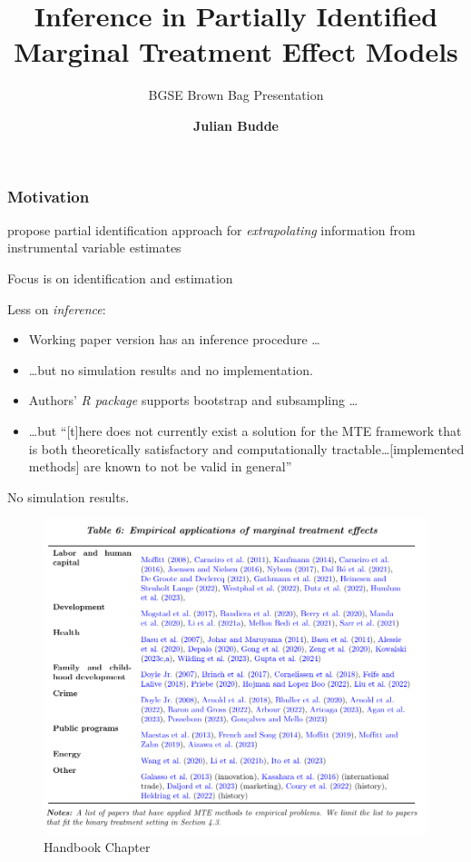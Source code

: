 \documentclass[11pt, aspectratio=169]{beamer}
\title{Inference in Partially Identified Marginal Treatment Effect Models}
\subtitle{BGSE Brown Bag Presentation}
\author[Julian Budde]{\bf Julian Budde}
\begin{document}
\begin{frame}
    \titlepage
    \note{~}
\end{frame}

\begin{frame}
    \frametitle{Motivation}

    \citet{mogstad2018using} propose partial identification approach for \textit{extrapolating} information from instrumental variable estimates

    \vspace{0.5cm}

    Focus is on identification and estimation

    \vspace{0.5cm}

    Less on \textit{inference}:

    \vspace{0.5cm}
    \pause
    \begin{itemize}
        \footnotesize
        \item Working paper version has an inference procedure \dots
        \item \dots but no simulation results and no implementation.
        \pause
        \item Authors' \textit{R package} supports bootstrap and subsampling \dots
        \item \dots but ``[t]here does not currently exist a solution for the MTE framework that is both theoretically
        satisfactory and computationally tractable\dots [implemented methods] are known to not be valid in general''
    \end{itemize}

    \vspace{0.5cm}
    No simulation results.

\end{frame}

\begin{frame}
    \begin{figure}
        \includegraphics[height=0.75\textheight]{mt_handbook_table6.png}
        \caption{\citet{mogstad2024instrumental} Handbook Chapter}
    \end{figure}
\end{frame}
\end{document}
